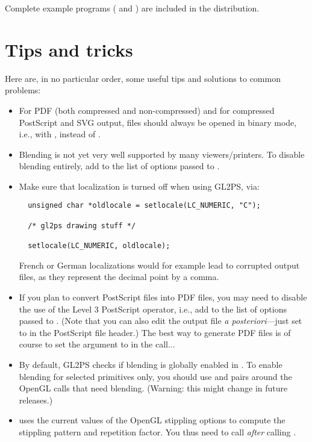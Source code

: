 Complete example programs ( and )
are included in the distribution.


\section{Tips and tricks}
\label{sec:tips}

Here are, in no particular order, some useful tips and solutions to common
problems:
\begin{itemize}
\item For PDF (both compressed and non-compressed) and for compressed
  PostScript and SVG output, files should always be opened in binary
  mode, i.e., with , instead of .
\item Blending is not yet very well supported by many viewers/printers. To
  disable blending entirely, add  to the list of
  options passed to .
\item Make sure that localization is turned off when using GL2PS, via:
\begin{verbatim}
  unsigned char *oldlocale = setlocale(LC_NUMERIC, "C");

  /* gl2ps drawing stuff */

  setlocale(LC_NUMERIC, oldlocale);
\end{verbatim}
  French or German localizations would for example lead to corrupted output
  files, as they represent the decimal point by a comma.
\item If you plan to convert PostScript files into PDF files, you may need
  to disable the use of the Level 3 PostScript  operator, i.e.,
  add  to the list of options passed to
  . (Note that you can also edit the output file \emph{a
    posteriori}---just set  to  in the
  PostScript file header.) The best way to generate PDF files is of course
  to set the  argument to  in the
   call...
\item By default, GL2PS checks if blending is globally enabled in
  . To enable blending for selected primitives
  only, you should use  and
   pairs around the OpenGL calls that
  need blending. (Warning: this might change in future releases.)
\item {} uses the current values of
  the OpenGL stippling options to compute the stippling pattern and
  repetition factor. You thus need to call
   \emph{after} calling
  .
 \end{itemize}


